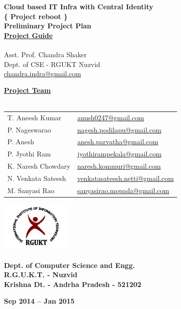 \documentclass[12pt]{report}
\begin{document}
\begin{titlepage}
 \begin{center}
\LARGE
\textbf{Cloud based IT Infra with Central Identity} \\
\vfill
\large
\textbf{\{ Project reboot \}}\\
\vfill
\textbf{Preliminary Project Plan }\\
\vfill
\Large
\underline{\textbf{Project Guide }} \\ 
\large
\underline{} \\
Asst. Prof. Chandra Shaker \\
\normalsize
Dept. of CSE - RGUKT Nuzvid \\
\url{chandra.indra@gmail.com}
\vfill

\Large
\textbf{\underline{ Project Team } } \\
\underline{} \\
\large
\begin{tabular}{l  l}
T. Aneesh Kumar & \normalsize \url{anush0247@gmail.com} \\
P. Nageswarao  & \normalsize \url{nagesh.podilapu@gmail.com} \\
P. Anesh  & \normalsize \url{anesh.parvatha@gmail.com} \\
P. Jyothi Ram & \normalsize \url{jyothirampekala@gmail.com} \\
K. Naresh Chowdary  & \normalsize \url{naresh.kommuri@gmail.com} \\
N. Venkata Sateesh  & \normalsize \url{venkatasateesh.netti@gmail.com} \\
M. Sanyasi Rao & \normalsize \url{sanyasirao.mopada@gmail.com} 
\end{tabular}

\vfill


\includegraphics[width=3.5cm]{rgukt_logo.jpg} 
\Large
\underline{} \\
\underline{} \\
\normalsize
\textbf{Dept. of Computer Science and Engg. } \\
\textbf{R.G.U.K.T. - Nuzvid } \\
\textbf{Krishna Dt. - Andrha Pradesh - 521202}


\normalsize
\vfill
%
%

\textbf{Sep 2014 -- Jan 2015 }

\end{center}
\end{titlepage}
\end{document}
